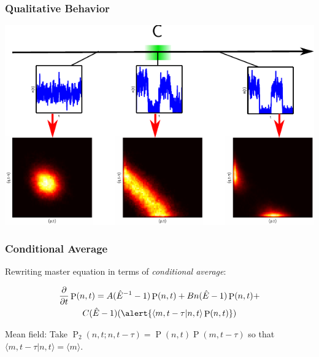 \documentclass[xcolor={usenames,dvipsnames,svgnames},url=hyphens]{beamer}
\DeclareMathOperator{\Prob}{P}
\begin{document}
\begin{frame}
    \frametitle{Qualitative Behavior}

    \includegraphics{figures/dd-joint-behavior.pdf}
\end{frame}

\begin{frame}
    \frametitle{Conditional Average}

    Rewriting master equation in terms of \emph{conditional average}:

    \begin{multline*}
        \frac{\partial}{\partial t} \Prob(n, t) = A(\hat{E}^{-1} - 1) \Prob(n, t) + B n(\hat{E} - 1) \Prob(n, t) + \\
        C (\hat{E} - 1) (\alert{\langle m, t - \tau | n, t \rangle \Prob(n, t)})
    \end{multline*}

    Mean field: Take $\Prob_2(n, t; n, t - \tau) = \Prob(n, t)\Prob(m, t - \tau)$ so that $\langle m, t - \tau | n, t \rangle = \langle m \rangle$.
    
\end{frame}
\end{document}
